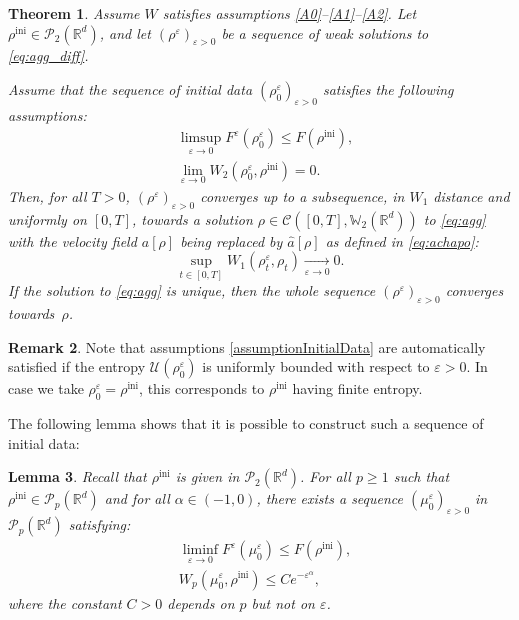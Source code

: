 \documentclass[11pt]{article}
\numberwithin{equation}{section}
\newcommand{\ini}{\mathrm{ini}}
\def\RR{\mathbb{R}}
\def\WW{\mathbb{W}}
\newcommand{\limi}[2]{\underset{#1 \to #2}{\longrightarrow}}
\def\eps{\varepsilon}
\def\calC{{\mathcal C}}
\def\calP{{\mathcal P}}
\def\calU{{\mathcal U}}
\def\achapo{\widehat{a}}
\theoremstyle{plain}
\newtheorem{theorem}{Theorem}[section]
\newtheorem{lemma}[theorem]{Lemma}
\theoremstyle{definition}
\newtheorem{remark}[theorem]{Remark}
\begin{document}
\begin{theorem}\label{thm:cvLipschitz}
Assume $W$ satisfies assumptions \eqref{A0}--\eqref{A1}--\eqref{A2}. Let $\rho^{\ini} \in \calP_2(\RR^d)$, and let $(\rho^\eps)_{\eps > 0}$ be a sequence of weak solutions to \eqref{eq:agg_diff}.

Assume that the sequence of initial data $(\rho_0^\eps)_{\eps > 0}$ satisfies the following assumptions:%
\begin{subequations}\label{assumptionInitialData}
\begin{align}
& \limsup_{\eps \to 0} F^\eps(\rho_0^\eps) \leq F(\rho^{\ini}), \label{assumptionInitialData:1} \\
& \lim_{\eps \to 0} W_2(\rho_0^\eps,\rho^{\ini}) = 0. \label{assumptionInitialData:4}
\end{align}
\end{subequations}
Then, for all $T>0$, $(\rho^\eps)_{\eps > 0}$ converges up to a subsequence, in $W_1$ distance and uniformly on $[0,T]$, towards a solution $\rho \in \calC([0,T], \WW _2(\RR^d))$ to \eqref{eq:agg} with the velocity field $a[\rho]$ being replaced by $\achapo[\rho]$ as defined in \eqref{eq:achapo}:
\[
\sup_{t \in [0,T]} W_1(\rho_t^\eps, \rho_t) \limi{\eps}{0} 0.
\]
If the solution to \eqref{eq:agg} is unique, then the whole sequence $(\rho^\eps)_{\eps > 0}$ converges towards~$\rho$.
\end{theorem}
\begin{remark}
Note that assumptions \eqref{assumptionInitialData} are automatically satisfied if the entropy $\calU(\rho_0^\eps)$ is uniformly bounded with respect to $\eps>0$. In case we take $\rho_0^\eps = \rho^{\ini}$, this corresponds to $\rho^{\ini}$ having finite entropy.
\end{remark}
The following lemma shows that it is possible to construct such a sequence of initial data:
\begin{lemma}\label{lemma:initialData}
Recall that $\rho^{\ini}$ is given in $\calP_2(\RR^d)$. For all $p \geq 1$ such that $\rho^{\ini} \in \calP_p(\RR^d)$ and for all $\alpha \in (-1,0)$, there exists a sequence $(\mu_0^\eps)_{\eps > 0}$ in $\calP_p(\RR^d)$ satisfying:
\begin{subequations}\label{smoothedInitialData}
\begin{align}
& \liminf_{\eps \to 0} F^\eps(\mu_0^\eps) \leq F(\rho^{\ini}), \label{smoothedInitialData:1} \\
& W_p(\mu_0^\eps,\rho^{\ini}) \leq Ce^{-\eps^\alpha},\label{smoothedInitialData:4}
\end{align}
\end{subequations}
where the constant $C>0$ depends on $p$ but not on $\eps$.
\end{lemma}
\end{document}
